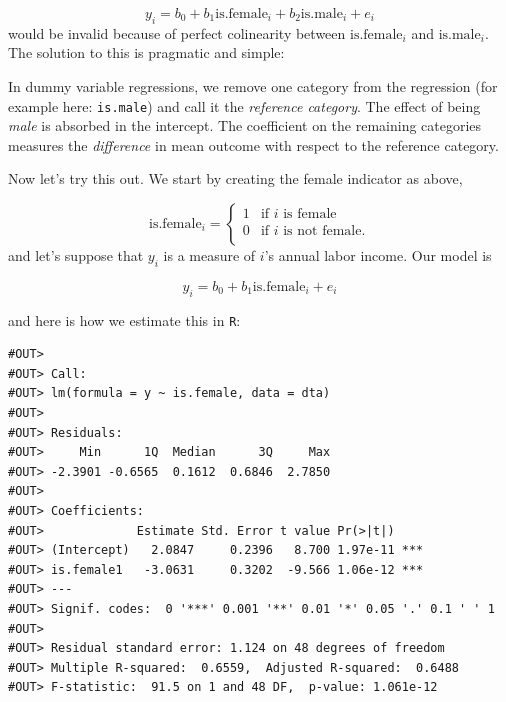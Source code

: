 \documentclass[]{book}
\newenvironment{Shaded}{\begin{snugshade}}{\end{snugshade}}
\newcommand{\CommentTok}[1]{\textcolor[rgb]{0.56,0.35,0.01}{\textit{#1}}}
\newcommand{\KeywordTok}[1]{\textcolor[rgb]{0.13,0.29,0.53}{\textbf{#1}}}
\newcommand{\NormalTok}[1]{#1}
\newcommand{\OperatorTok}[1]{\textcolor[rgb]{0.81,0.36,0.00}{\textbf{#1}}}
\newcommand{\StringTok}[1]{\textcolor[rgb]{0.31,0.60,0.02}{#1}}
\newenvironment{tip}{\begin{tcolorbox}[colback=green!5!white,colframe=green]}{\end{tcolorbox}}
\begin{document}
\[
y_i = b_0 + b_1 \text{is.female}_i + b_2 \text{is.male}_i + e_i
\]
would be invalid because of perfect colinearity between \(\text{is.female}_i\) and \(\text{is.male}_i\). The solution to this is pragmatic and simple:

\begin{tip}
In dummy variable regressions, we remove one category from the
regression (for example here: \texttt{is.male}) and call it the
\emph{reference category}. The effect of being \emph{male} is absorbed
in the intercept. The coefficient on the remaining categories measures
the \emph{difference} in mean outcome with respect to the reference
category.
\end{tip}

Now let's try this out. We start by creating the female indicator as above,

\[
\text{is.female}_i = \begin{cases}
          1 & \text{if }i\text{ is female} \\
            0 & \text{if }i\text{ is not female}. \\
   \end{cases}
\]
and let's suppose that \(y_i\) is a measure of \(i\)'s annual labor income. Our model is

\begin{equation}
y_i = b_0 + b_1 \text{is.female}_i + e_i \label{eq:dummy-reg}
\end{equation}

and here is how we estimate this in \texttt{R}:

\begin{Shaded}
\end{Shaded}

\begin{verbatim}
#OUT> 
#OUT> Call:
#OUT> lm(formula = y ~ is.female, data = dta)
#OUT> 
#OUT> Residuals:
#OUT>     Min      1Q  Median      3Q     Max 
#OUT> -2.3901 -0.6565  0.1612  0.6846  2.7850 
#OUT> 
#OUT> Coefficients:
#OUT>             Estimate Std. Error t value Pr(>|t|)    
#OUT> (Intercept)   2.0847     0.2396   8.700 1.97e-11 ***
#OUT> is.female1   -3.0631     0.3202  -9.566 1.06e-12 ***
#OUT> ---
#OUT> Signif. codes:  0 '***' 0.001 '**' 0.01 '*' 0.05 '.' 0.1 ' ' 1
#OUT> 
#OUT> Residual standard error: 1.124 on 48 degrees of freedom
#OUT> Multiple R-squared:  0.6559,  Adjusted R-squared:  0.6488 
#OUT> F-statistic:  91.5 on 1 and 48 DF,  p-value: 1.061e-12
\end{verbatim}
\end{document}
